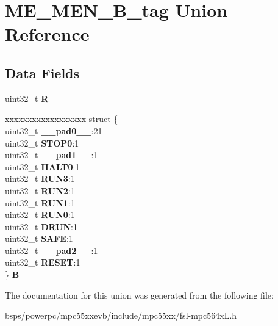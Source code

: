 \hypertarget{unionME__MEN__32B__tag}{}\section{M\+E\+\_\+\+M\+E\+N\+\_\+B\+\_\+tag Union Reference}
\label{unionME__MEN__32B__tag}
\subsection*{Data Fields}
\begin{DoxyCompactItemize}
\item 
\mbox{\label{unionME__MEN__32B__tag_a8bfc0b4859997acae7910937460a92f9}} 
uint32\+\_\+t {\bfseries R}
\item 
\mbox{\label{unionME__MEN__32B__tag_a1b4bfac419afd757d0d3f362581902a6}} 
\begin{tabbing}
xx\=xx\=xx\=xx\=xx\=xx\=xx\=xx\=xx\=\kill
struct \{\\
\>uint32\_t {\bfseries \_\_pad0\_\_}:21\\
\>uint32\_t {\bfseries STOP0}:1\\
\>uint32\_t {\bfseries \_\_pad1\_\_}:1\\
\>uint32\_t {\bfseries HALT0}:1\\
\>uint32\_t {\bfseries RUN3}:1\\
\>uint32\_t {\bfseries RUN2}:1\\
\>uint32\_t {\bfseries RUN1}:1\\
\>uint32\_t {\bfseries RUN0}:1\\
\>uint32\_t {\bfseries DRUN}:1\\
\>uint32\_t {\bfseries SAFE}:1\\
\>uint32\_t {\bfseries \_\_pad2\_\_}:1\\
\>uint32\_t {\bfseries RESET}:1\\
\} {\bfseries B}\\

\end{tabbing}\end{DoxyCompactItemize}


The documentation for this union was generated from the following file\+:\begin{DoxyCompactItemize}
\item 
bsps/powerpc/mpc55xxevb/include/mpc55xx/fsl-\/mpc564x\+L.\+h\end{DoxyCompactItemize}

